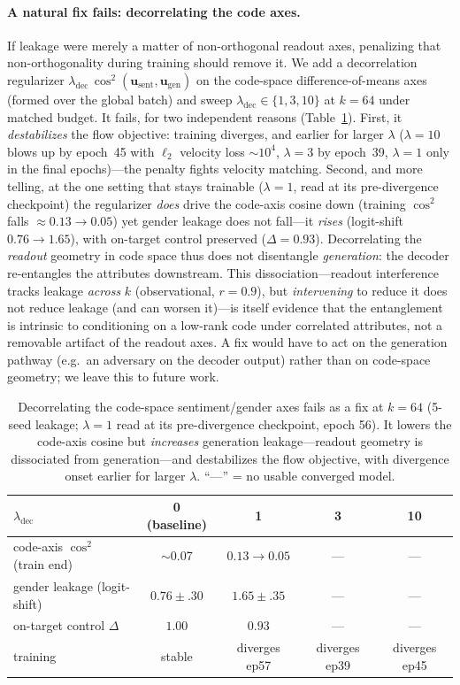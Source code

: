 \documentclass[11pt]{article}
\begin{document}
\paragraph{A natural fix fails: decorrelating the code axes.}
If leakage were merely a matter of non-orthogonal readout axes, penalizing that
non-orthogonality during training should remove it. We add a decorrelation
regularizer $\lambda_{\mathrm{dec}}\,\cos^2(\bm u_{\text{sent}},\bm u_{\text{gen}})$
on the code-space difference-of-means axes (formed over the global batch) and sweep
$\lambda_{\mathrm{dec}}\in\{1,3,10\}$ at $k{=}64$ under matched budget. It fails,
for two independent reasons (Table~\ref{tab:mitig}). First, it \emph{destabilizes}
the flow objective: training diverges, and earlier for larger $\lambda$
($\lambda{=}10$ blows up by epoch~45 with $\ell_2$ velocity loss $\sim\!10^4$,
$\lambda{=}3$ by epoch~39, $\lambda{=}1$ only in the final epochs)---the penalty
fights velocity matching. Second, and more telling, at the one setting that stays
trainable ($\lambda{=}1$, read at its pre-divergence checkpoint) the regularizer
\emph{does} drive the code-axis cosine down (training $\cos^2$ falls
$\approx0.13\!\to\!0.05$) yet gender leakage does not fall---it \emph{rises}
(logit-shift $0.76\!\to\!1.65$), with on-target control preserved
($\Delta{=}0.93$). Decorrelating the \emph{readout} geometry in code space thus
does not disentangle \emph{generation}: the decoder re-entangles the attributes
downstream. This dissociation---readout interference tracks leakage \emph{across}
$k$ (observational, $r{=}0.9$), but \emph{intervening} to reduce it does not reduce
leakage (and can worsen it)---is itself evidence that the entanglement is intrinsic
to conditioning on a low-rank code under correlated attributes, not a removable
artifact of the readout axes. A fix would have to act on the generation pathway
(e.g.\ an adversary on the decoder output) rather than on code-space geometry; we
leave this to future work.

\begin{table}[h]\centering\small
\begin{tabular}{l cccc}
$\lambda_{\mathrm{dec}}$ & 0 (baseline) & 1 & 3 & 10 \\
\hline
code-axis $\cos^2$ (train end) & $\sim$0.07 & $0.13\!\to\!0.05$ & --- & --- \\
gender leakage (logit-shift)   & $0.76\!\pm\!.30$ & $1.65\!\pm\!.35$ & --- & --- \\
on-target control $\Delta$     & $1.00$ & $0.93$ & --- & --- \\
training                       & stable & diverges ep57 & diverges ep39 & diverges ep45 \\
\end{tabular}
\caption{Decorrelating the code-space sentiment/gender axes fails as a fix at
$k{=}64$ (5-seed leakage; $\lambda{=}1$ read at its pre-divergence checkpoint, epoch
56). It lowers the code-axis cosine but \emph{increases} generation leakage---readout
geometry is dissociated from generation---and destabilizes the flow objective, with
divergence onset earlier for larger $\lambda$. ``---'' = no usable converged model.}
\label{tab:mitig}
\end{table}
\end{document}
